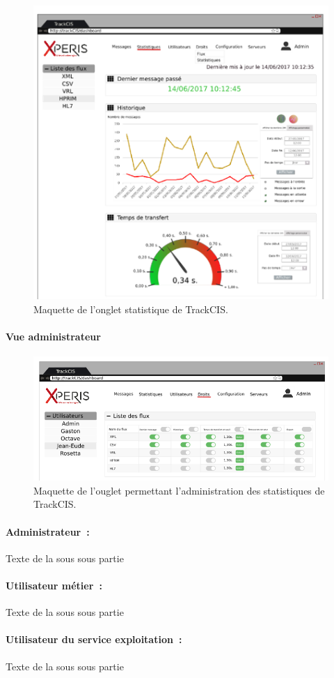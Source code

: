 			\begin{figure}[h]
				\centering
				\includegraphics[width=17cm]{../img/part2/maquette_user_1.png}
				\caption{\label{maquette_user} Maquette de l'onglet statistique de
				TrackCIS.}
			\end{figure}
			
			\paragraph{Vue administrateur}
			
			\begin{figure}[h]
				\centering
				\includegraphics[width=17cm]{../img/part2/maquette_admin_1.png}
				\caption{\label{maquette_admin} Maquette de l'ouglet permettant
				l'administration des statistiques de TrackCIS.}
			\end{figure}
		
			\paragraph{Administrateur~:}
			Texte de la sous sous partie
			
			\paragraph{Utilisateur métier~:}
			Texte de la sous sous partie
			
			\paragraph*{Utilisateur du service exploitation~:}
			Texte de la sous sous partie
			